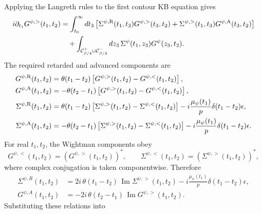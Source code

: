 \documentclass[11pt,a4paper]{article}
\begin{document}
Applying the Langreth rules to the first contour KB equation gives
\begin{equation}
\begin{aligned}
i\partial_{t_1}G^{\psi,>}(t_1,t_2)
&=
\int_{t_0}^{\infty}dt_3
\left[
\Sigma^{\psi,{\rm R}}(t_1,t_3)
G^{\psi,>}(t_3,t_2)
+
\Sigma^{\psi,>}(t_1,t_3)
G^{\psi,{\rm A}}(t_3,t_2)
\right]
\\
&\quad
+
\int_{\mathcal C^+_{\beta/4}\cup\mathcal C^-_{\beta/4}}
dz_3\,
\Sigma^\psi(t_1,z_3)G^\psi(z_3,t_2).
\end{aligned}
\label{eq:S-kb-greater-Langreth}
\end{equation}
The required retarded and advanced components are
\begin{equation}
\begin{aligned}
G^{\psi,{\rm R}}(t_1,t_2)
&=
\theta(t_1-t_2)
\left[
G^{\psi,>}(t_1,t_2)
-
G^{\psi,<}(t_1,t_2)
\right],
\\
G^{\psi,{\rm A}}(t_1,t_2)
&=
-\theta(t_2-t_1)
\left[
G^{\psi,>}(t_1,t_2)
-
G^{\psi,<}(t_1,t_2)
\right],
\\
\Sigma^{\psi,{\rm R}}(t_1,t_2)
&=
\theta(t_1-t_2)
\left[
\Sigma^{\psi,>}(t_1,t_2)
-
\Sigma^{\psi,<}(t_1,t_2)
\right]
-i\frac{\mu_\psi(t_1)}{p}
\delta(t_1-t_2)\epsilon,
\\
\Sigma^{\psi,{\rm A}}(t_1,t_2)
&=
-\theta(t_2-t_1)
\left[
\Sigma^{\psi,>}(t_1,t_2)
-
\Sigma^{\psi,<}(t_1,t_2)
\right]
-i\frac{\mu_\psi(t_1)}{p}
\delta(t_1-t_2)\epsilon .
\end{aligned}
\label{eq:S-retarded-advanced}
\end{equation}
For real \(t_1,t_2\), the Wightman components obey
\begin{equation}
\label{eq:lesser-greater-conjugation}
  G^{\psi,<}(t_1,t_2)
  =
  \left(G^{\psi,>}(t_1,t_2)\right)^*,
  \qquad
  \Sigma^{\psi,<}(t_1,t_2)
  =
  \left(\Sigma^{\psi,>}(t_1,t_2)\right)^*,
\end{equation}
where complex conjugation is taken componentwise.  Therefore
\begin{equation}
\label{eq:retarded-advanced-imaginary}
\begin{aligned}
  \Sigma^{\psi,R}(t_1,t_2)
  &=
  2i\,\theta(t_1-t_2)\,
  \operatorname{Im}\Sigma^{\psi,>}(t_1,t_2)
  -
  i\frac{\mu_\psi(t_1)}{p}\delta(t_1-t_2)\epsilon,
  \\
  G^{\psi,A}(t_1,t_2)
  &=
  -2i\,\theta(t_2-t_1)\,
  \operatorname{Im}G^{\psi,>}(t_1,t_2).
\end{aligned}
\end{equation}
Substituting these relations into
\end{document}
